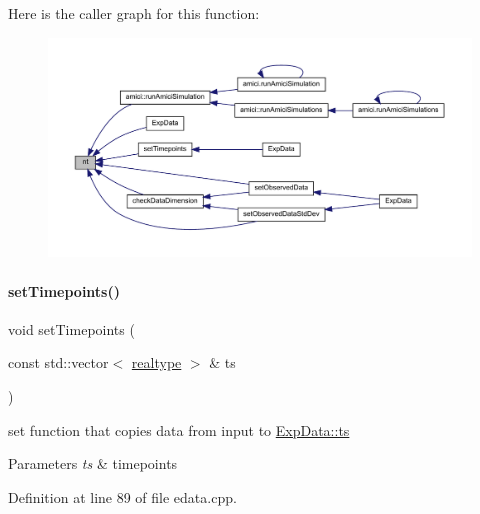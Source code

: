 Here is the caller graph for this function\+:
\nopagebreak
\begin{figure}[H]
\begin{center}
\leavevmode
\includegraphics[width=350pt]{classamici_1_1_exp_data_a4c23d300cbe15b0afb1ee3731d47cc93_icgraph}
\end{center}
\end{figure}
\mbox{\label{classamici_1_1_exp_data_a058fb6c96339b5116b1af937bc77c2e4}} 
\paragraph{\texorpdfstring{set\+Timepoints()}{setTimepoints()}}
{\footnotesize\ttfamily void set\+Timepoints (\begin{DoxyParamCaption}\item[{const std\+::vector$<$ \mbox{\hyperlink{namespaceamici_a1bdce28051d6a53868f7ccbf5f2c14a3}{realtype}} $>$ \&}]{ts }\end{DoxyParamCaption})}

set function that copies data from input to \mbox{\hyperlink{classamici_1_1_exp_data_aa7014a80e7b102f85a10e3b9a480e8e5}{Exp\+Data\+::ts}}


\begin{DoxyParams}{Parameters}
{\em ts} & timepoints \\
\hline
\end{DoxyParams}


Definition at line 89 of file edata.\+cpp.

